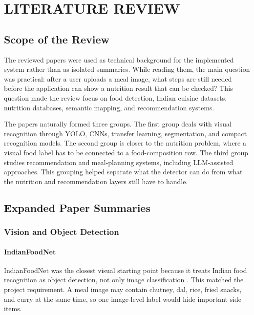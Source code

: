 \chapter{LITERATURE REVIEW}

\section{Scope of the Review}

The reviewed papers were used as technical background for the implemented system rather than as isolated summaries. While reading them, the main question was practical: after a user uploads a meal image, what steps are still needed before the application can show a nutrition result that can be checked? This question made the review focus on food detection, Indian cuisine datasets, nutrition databases, semantic mapping, and recommendation systems.

The papers naturally formed three groups. The first group deals with visual recognition through YOLO, CNNs, transfer learning, segmentation, and compact recognition models. The second group is closer to the nutrition problem, where a visual food label has to be connected to a food-composition row. The third group studies recommendation and meal-planning systems, including LLM-assisted approaches. This grouping helped separate what the detector can do from what the nutrition and recommendation layers still have to handle.

\section{Expanded Paper Summaries}

\subsection{Vision and Object Detection}

\subsubsection{IndianFoodNet}

IndianFoodNet was the closest visual starting point because it treats Indian food recognition as object detection, not only image classification \cite{indianfoodnet_2023}. This matched the project requirement. A meal image may contain chutney, dal, rice, fried snacks, and curry at the same time, so one image-level label would hide important side items.

